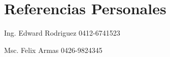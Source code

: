 \documentclass{tccv}
\begin{document}
\section{Referencias Personales}

\begin{referencias}

\item{}
     {Ing. Edward Rodriguez}
     {0412-6741523}

\item{}
     {Msc. Felix Armas }
     {0426-9824345}

\end{referencias}
\end{document}
